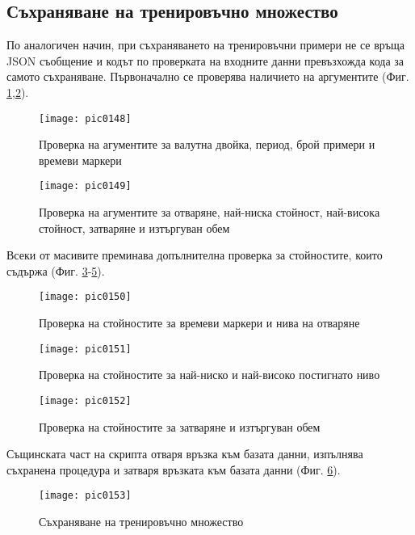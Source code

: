 \subsection{Съхраняване на тренировъчно множество}

По аналогичен начин, при съхраняването на тренировъчни примери не се връща JSON съобщение и кодът по проверката на входните данни превъзхожда кода за самото съхраняване. Първоначално се проверява наличието на аргументите (Фиг. \ref{fig:pic0148},\ref{fig:pic0149}).

\begin{figure}[h]
  \centering
  \texttt{[image: pic0148]}
  \caption{Проверка на агументите за валутна двойка, период, брой примери и времеви маркери}
\label{fig:pic0148}
\end{figure}
\FloatBarrier

\begin{figure}[h]
  \centering
  \texttt{[image: pic0149]}
  \caption{Проверка на агументите за отваряне, най-ниска стойност, най-висока стойност, затваряне и изтъргуван обем}
\label{fig:pic0149}
\end{figure}
\FloatBarrier

Всеки от масивите преминава допълнителна проверка за стойностите, които съдържа (Фиг. \ref{fig:pic0150}-\ref{fig:pic0152}).

\begin{figure}[h]
  \centering
  \texttt{[image: pic0150]}
  \caption{Проверка на стойностите за времеви маркери и нива на отваряне}
\label{fig:pic0150}
\end{figure}
\FloatBarrier

\begin{figure}[h]
  \centering
  \texttt{[image: pic0151]}
  \caption{Проверка на стойностите за най-ниско и най-високо постигнато ниво}
\label{fig:pic0151}
\end{figure}
\FloatBarrier

\begin{figure}[h]
  \centering
  \texttt{[image: pic0152]}
  \caption{Проверка на стойностите за затваряне и изтъргуван обем}
\label{fig:pic0152}
\end{figure}
\FloatBarrier

Същинската част на скрипта отваря връзка към базата данни, изпълнява съхранена процедура и затваря връзката към базата данни (Фиг. \ref{fig:pic0153}).

\begin{figure}[h]
  \centering
  \texttt{[image: pic0153]}
  \caption{Съхраняване на тренировъчно множество}
\label{fig:pic0153}
\end{figure}
\FloatBarrier